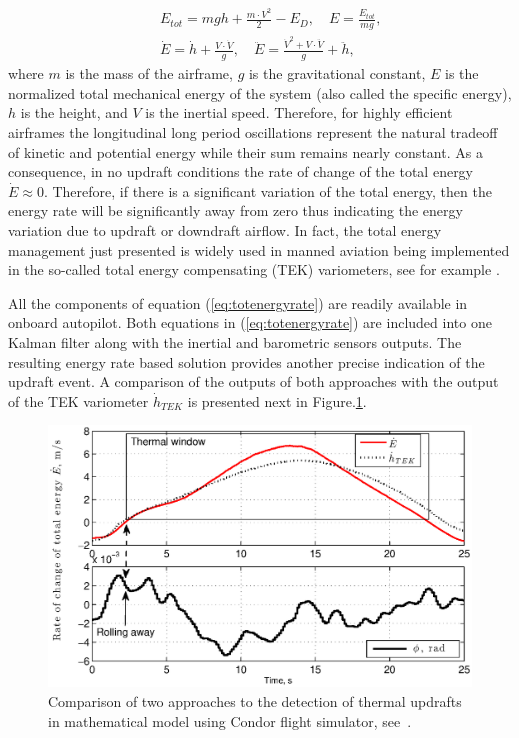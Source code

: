 \documentclass{ifacconf}
\begin{document}
\begin{eqnarray}
    && E_{tot}=mgh+\frac{m\cdot V^2}{2}-E_{D}, \quad E=\frac{E_{tot}}{mg}, \nonumber \\
    && \dot{E}=\dot{h}+\frac{V \cdot \dot{V}}{g}, \quad \ddot{E}=\frac{\dot{V}^2 + V \cdot \ddot{V}}{g} + \ddot{h},
    \label{eq:totenergyrate}
\end{eqnarray}
where $m$ is the mass of the airframe, $g$ is the gravitational constant, $E$ is the normalized total mechanical energy of the system (also called the specific energy), $h$ is the height, and $V$ is the inertial speed. Therefore, for highly efficient airframes the longitudinal long period oscillations represent the natural tradeoff of kinetic and potential energy while their sum remains nearly constant. As a consequence, in no updraft conditions the rate of change of the total energy $\dot{E}\approx 0$. Therefore, if there is a significant variation of the total energy, then the energy rate will be significantly away from zero thus indicating the energy variation due to updraft or downdraft airflow. In fact, the total energy management just presented is widely used in manned aviation being implemented in the so-called total energy compensating (TEK) variometers, see for example \cite{PitLab:2013:Online}.

All the components of equation (\ref{eq:totenergyrate}) are readily available in onboard autopilot. Both equations in (\ref{eq:totenergyrate}) are included into one Kalman filter along with the inertial and barometric sensors outputs. The resulting energy rate based solution provides another precise indication of the updraft event. A comparison of the outputs of both approaches with the output  of the TEK variometer $\dot{h}_{TEK}$ is presented next in Figure.\ref{fig:ThermalDetection}.

\begin{figure}[thpb]
  \centering
  \includegraphics[scale=0.45]{Figures/TEK_Bank.eps}
  \caption{Comparison of two approaches to the detection of thermal updrafts in mathematical model using Condor flight simulator, see~\cite{Condor:2013:Online}. }
  \label{fig:ThermalDetection}
\end{figure}
\end{document}
